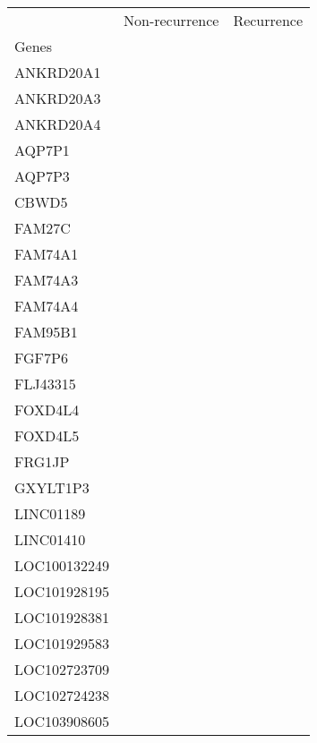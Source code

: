 \begin{tabular}{lcc}
\toprule
{} & Non-recurrence & Recurrence \\
Genes              &                &            \\
\midrule
ANKRD20A1          &                &            \\
ANKRD20A3          &                &            \\
ANKRD20A4          &                &            \\
AQP7P1             &                &            \\
AQP7P3             &                &            \\
CBWD5              &                &            \\
FAM27C             &                &            \\
FAM74A1            &                &            \\
FAM74A3            &                &            \\
FAM74A4            &                &            \\
FAM95B1            &                &            \\
FGF7P6             &                &            \\
FLJ43315           &                &            \\
FOXD4L4            &                &            \\
FOXD4L5            &                &            \\
FRG1JP             &                &            \\
GXYLT1P3           &                &            \\
LINC01189          &                &            \\
LINC01410          &                &            \\
LOC100132249       &                &            \\
LOC101928195       &                &            \\
LOC101928381       &                &            \\
LOC101929583       &                &            \\
LOC102723709       &                &            \\
LOC102724238       &                &            \\
LOC103908605       &                &            \\

\end{tabular}
